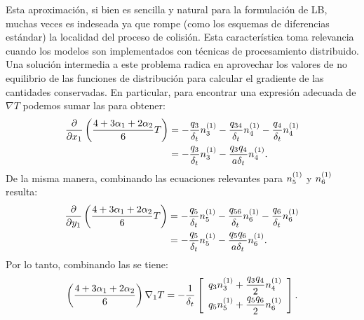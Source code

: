 Esta aproximaci\'on, si bien es sencilla y natural para la formulaci\'on de LB, muchas veces es indeseada ya que rompe (como los esquemas de diferencias est\'andar) la localidad del proceso de colisi\'on. Esta caracter\'istica toma relevancia cuando los modelos son implementados con t\'ecnicas de procesamiento distribuido. Una soluci\'on intermedia a este problema radica en aprovechar los valores de no equilibrio de las funciones de distribuci\'on para calcular el gradiente de las cantidades conservadas. En particular, para encontrar una expresi\'on adecuada de $\nabla T$ podemos sumar las  para obtener:
\begin{equation}
\begin{aligned}
	\dfrac{\partial}{\partial x_1} \left( \dfrac{4+3\alpha_1+2\alpha_2}{6} T \right) &= -\dfrac{q_3}{\delta_t} n_{3}^{(1)} - \dfrac{q_{34}}{\delta_t} n_{4}^{(1)} - \dfrac{q_4}{\delta_t} n_{4}^{(1)} \\
	&= -\dfrac{q_3}{\delta_t} n_{3}^{(1)} - \dfrac{q_3 q_4}{a \delta_t} n_{4}^{(1)}.
\end{aligned}
	\label{eq:partial_1_x}
\end{equation}
De la misma manera, combinando las ecuaciones relevantes para $n_{5}^{(1)}$ y $n_{6}^{(1)}$ resulta:
\begin{equation}
\begin{aligned}
	\dfrac{\partial}{\partial y_1} \left( \dfrac{4+3\alpha_1+2\alpha_2}{6} T \right) &= -\dfrac{q_5}{\delta_t} n_{5}^{(1)} - \dfrac{q_{56}}{\delta_t} n_{6}^{(1)} - \dfrac{q_6}{\delta_t} n_{6}^{(1)} \\
	&= -\dfrac{q_5}{\delta_t} n_{5}^{(1)} - \dfrac{q_5 q_6}{a \delta_t} n_{6}^{(1)}.
\end{aligned}
	\label{eq:partial_1_y}
\end{equation}
Por lo tanto, combinando las  se tiene:
\begin{equation}
	\left( \dfrac{4+3\alpha_1+2\alpha_2}{6} \right) \nabla_1 T= -\dfrac{1}{\delta_t}
	\left[ 
 	\begin{array}{c} 
 		q_3 n_{3}^{(1)}  +  \dfrac{q_3q_4}{2}n_{4}^{(1)} \\[2mm]
 		q_5 n_{5}^{(1)}  +  \dfrac{q_5q_6}{2}n_{6}^{(1)}
 	\end{array} 
	\right].
	\label{eq:grad1_T}
\end{equation}


